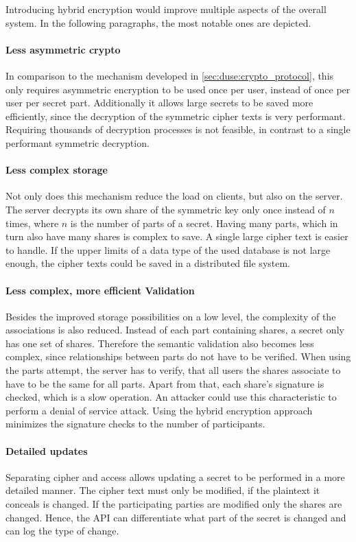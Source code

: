Introducing hybrid encryption would improve multiple aspects of the overall
system. In the following paragraphs, the most notable ones are depicted.

\paragraph{Less asymmetric crypto}{ In comparison to the mechanism developed in
  \ref{sec:duse:crypto_protocol}, this only requires asymmetric encryption to
  be used once per user, instead of once per user per secret part. Additionally
  it allows large secrets to be saved more efficiently, since the decryption of
the symmetric cipher texts is very performant. Requiring thousands of
decryption processes is not feasible, in contrast to a single performant
symmetric decryption.}

\paragraph{Less complex storage}{ Not only does this mechanism reduce the load
  on clients, but also on the server. The server decrypts its own share of the
  symmetric key only once instead of $n$ times, where $n$ is the number of
  parts of a secret.  Having many parts, which in turn also have many shares is
complex to save. A single large cipher text is easier to handle. If the upper
limits of a data type of the used database is not large enough, the cipher
texts could be saved in a distributed file system.}

\paragraph{Less complex, more efficient Validation}{ Besides the improved
  storage possibilities on a low level, the complexity of the associations is
  also reduced. Instead of each part containing shares, a secret only has one
  set of shares.  Therefore the semantic validation also becomes less complex,
  since relationships between parts do not have to be verified. When using the
  parts attempt, the server has to verify, that all users the shares associate
  to have to be the same for all parts. Apart from that, each share's signature
  is checked, which is a slow operation. An attacker could use this
characteristic to perform a denial of service attack. Using the hybrid
encryption approach minimizes the signature checks to the number of
participants. }

\paragraph{Detailed updates}{ Separating cipher and access allows updating a
  secret to be performed in a more detailed manner. The cipher text must only
  be modified, if the plaintext it conceals is changed. If the participating
  parties are modified only the shares are changed. Hence, the API can
differentiate what part of the secret is changed and can log the type of
change. }
